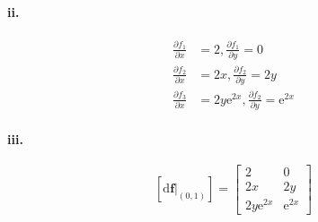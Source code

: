 \documentclass[11pt, a4paper]{article}
\begin{document}
\paragraph{ii.}
$$\begin{aligned}
\frac{\partial{f_1}}{\partial{x}} &= 2,
\frac{\partial{f_1}}{\partial{y}} = 0 \\
\frac{\partial{f_2}}{\partial{x}} &= 2x,
\frac{\partial{f_2}}{\partial{y}} = 2y \\
\frac{\partial{f_3}}{\partial{x}} &= 2y\mathrm{e} ^ {2x},\frac{\partial{f_2}}{\partial{y}} = \mathrm{e} ^ {2x}
\end{aligned}$$

\paragraph{iii.}
$$[\mathrm{d}\bm{f}|_{(0, 1)}] = 
\begin{bmatrix}
    2 & 0 \\
    2x & 2y \\
    2y\mathrm{e} ^ {2x} & \mathrm{e} ^ {2x}
\end{bmatrix}$$
\end{document}
